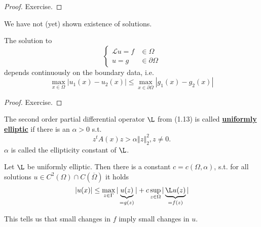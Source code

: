 \begin{proof}
    Exercise.
\end{proof}

\begin{remark}
    We have not (yet) shown existence of solutions.
\end{remark}

\begin{corollary}
    The solution to     \[\begin{cases}\mathcal{L}u=f & \in\Omega\\ u=g & \in \partial \Omega\end{cases} \] 
    depends continuously on the boundary data, i.e.
    \[\max_{x\in \Omega}|u_1(x)-u_2(x)|\leq \max_{x\in \partial \Omega} |g_1(x)-g_2(x)|\]
\end{corollary}

\begin{proof}
    Exercise.
\end{proof}

\begin{definition}
    The second order partial differential operator $\L$ from (1.13) is called 
    \underline{\textbf{uniformly elliptic}} if there is an $\alpha>0$ s.t. 
    \[z^t A(x)z>\alpha \left\Vert z \right\Vert_2^2,z\neq 0.\]
    $\alpha$ is called the ellipticity constant of $\L$.
\end{definition}

\begin{corollary}
    Let $\L$ be uniformly elliptic. Then there is a constant $c=c(\Omega,\alpha)$, s.t. for 
    all solutions $u\in C^2(\Omega)\cap C(\overline{\Omega})$ it holds
    \[\left\vert u(x) \right\vert \leq \max_{z\in \Gamma} |\underbrace{u(z)}_{=g(z)}|+c\sup_{z\in \Omega}|\underbrace{\L u(z)}_{=f(z)}|\]
\end{corollary}

\begin{remark}
    This tells us that small changes in $f$ imply small changes in $u$.
\end{remark}

